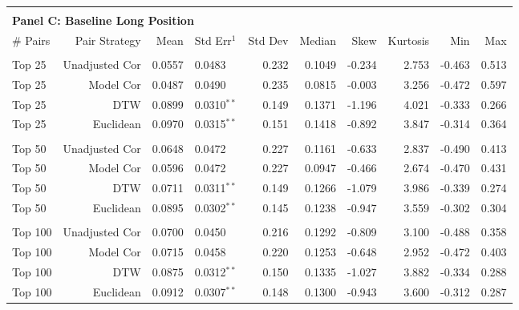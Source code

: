 \documentclass[12pt]{report}
\begin{document}
\begin{table}[hp]
\begin{tabular}{l r r l r r r r r r}
        \vspace{-1mm} \\
        \hline
        \vspace{1 mm} \\
        \multicolumn{9}{l}{\textbf{Panel C: Baseline Long Position}} \\
        \# Pairs & Pair Strategy & Mean & Std Err{$^{1}$} & Std Dev & Median & Skew & Kurtosis & Min & Max \\
        \hline
        \vspace{-1mm} \\
        Top 25    & Unadjusted Cor & 0.0557 & 0.0483          & 0.232 & 0.1049 & -0.234 & 2.753 & -0.463 & 0.513 \\
        Top 25    & Model Cor      & 0.0487 & 0.0490          & 0.235 & 0.0815 & -0.003 & 3.256 & -0.472 & 0.597 \\
        Top 25    & DTW            & 0.0899 & 0.0310{$^{**}$} & 0.149 & 0.1371 & -1.196 & 4.021 & -0.333 & 0.266 \\
        Top 25    & Euclidean      & 0.0970 & 0.0315{$^{**}$} & 0.151 & 0.1418 & -0.892 & 3.847 & -0.314 & 0.364 \\
        \vspace{-1mm} \\
        Top 50    & Unadjusted Cor & 0.0648 & 0.0472          & 0.227 & 0.1161 & -0.633 & 2.837 & -0.490 & 0.413 \\
        Top 50    & Model Cor      & 0.0596 & 0.0472          & 0.227 & 0.0947 & -0.466 & 2.674 & -0.470 & 0.431 \\
        Top 50    & DTW            & 0.0711 & 0.0311{$^{**}$} & 0.149 & 0.1266 & -1.079 & 3.986 & -0.339 & 0.274 \\
        Top 50    & Euclidean      & 0.0895 & 0.0302{$^{**}$} & 0.145 & 0.1238 & -0.947 & 3.559 & -0.302 & 0.304 \\
        \vspace{-1mm} \\
        Top 100   & Unadjusted Cor & 0.0700 & 0.0450          & 0.216 & 0.1292 & -0.809 & 3.100 & -0.488 & 0.358 \\
        Top 100   & Model Cor      & 0.0715 & 0.0458          & 0.220 & 0.1253 & -0.648 & 2.952 & -0.472 & 0.403 \\
        Top 100   & DTW            & 0.0875 & 0.0312{$^{**}$} & 0.150 & 0.1335 & -1.027 & 3.882 & -0.334 & 0.288 \\
        Top 100   & Euclidean      & 0.0912 & 0.0307{$^{**}$} & 0.148 & 0.1300 & -0.943 & 3.600 & -0.312 & 0.287 \\

\end{tabular}
\end{table}
\end{document}
